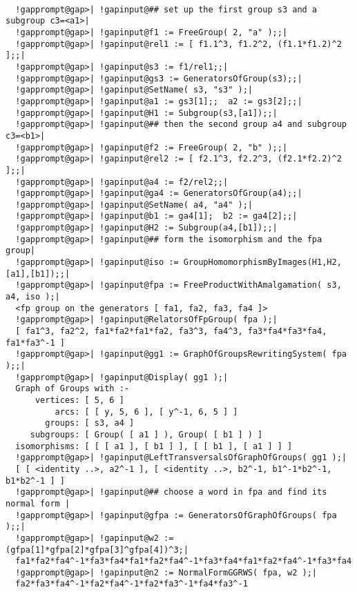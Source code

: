 \documentclass[a4paper,11pt]{report}
\begin{document}
{{{ }

 
\begin{Verbatim}[commandchars=!@|,fontsize=\small,frame=single,label=Example]
  
  !gapprompt@gap>| !gapinput@## set up the first group s3 and a subgroup c3=<a1>|
  !gapprompt@gap>| !gapinput@f1 := FreeGroup( 2, "a" );;|
  !gapprompt@gap>| !gapinput@rel1 := [ f1.1^3, f1.2^2, (f1.1*f1.2)^2 ];;|
  !gapprompt@gap>| !gapinput@s3 := f1/rel1;;|
  !gapprompt@gap>| !gapinput@gs3 := GeneratorsOfGroup(s3);;|
  !gapprompt@gap>| !gapinput@SetName( s3, "s3" );|
  !gapprompt@gap>| !gapinput@a1 := gs3[1];;  a2 := gs3[2];;|
  !gapprompt@gap>| !gapinput@H1 := Subgroup(s3,[a1]);;|
  !gapprompt@gap>| !gapinput@## then the second group a4 and subgroup c3=<b1>|
  !gapprompt@gap>| !gapinput@f2 := FreeGroup( 2, "b" );;|
  !gapprompt@gap>| !gapinput@rel2 := [ f2.1^3, f2.2^3, (f2.1*f2.2)^2 ];;|
  !gapprompt@gap>| !gapinput@a4 := f2/rel2;;|
  !gapprompt@gap>| !gapinput@ga4 := GeneratorsOfGroup(a4);;|
  !gapprompt@gap>| !gapinput@SetName( a4, "a4" );|
  !gapprompt@gap>| !gapinput@b1 := ga4[1];  b2 := ga4[2];;|
  !gapprompt@gap>| !gapinput@H2 := Subgroup(a4,[b1]);;|
  !gapprompt@gap>| !gapinput@## form the isomorphism and the fpa group|
  !gapprompt@gap>| !gapinput@iso := GroupHomomorphismByImages(H1,H2,[a1],[b1]);;|
  !gapprompt@gap>| !gapinput@fpa := FreeProductWithAmalgamation( s3, a4, iso );|
  <fp group on the generators [ fa1, fa2, fa3, fa4 ]>
  !gapprompt@gap>| !gapinput@RelatorsOfFpGroup( fpa );|
  [ fa1^3, fa2^2, fa1*fa2*fa1*fa2, fa3^3, fa4^3, fa3*fa4*fa3*fa4, fa1*fa3^-1 ]
  !gapprompt@gap>| !gapinput@gg1 := GraphOfGroupsRewritingSystem( fpa );;|
  !gapprompt@gap>| !gapinput@Display( gg1 );|
  Graph of Groups with :-
      vertices: [ 5, 6 ]
          arcs: [ [ y, 5, 6 ], [ y^-1, 6, 5 ] ]
        groups: [ s3, a4 ]
     subgroups: [ Group( [ a1 ] ), Group( [ b1 ] ) ]
  isomorphisms: [ [ [ a1 ], [ b1 ] ], [ [ b1 ], [ a1 ] ] ]
  !gapprompt@gap>| !gapinput@LeftTransversalsOfGraphOfGroups( gg1 );|
  [ [ <identity ..>, a2^-1 ], [ <identity ..>, b2^-1, b1^-1*b2^-1, b1*b2^-1 ] ]
  !gapprompt@gap>| !gapinput@## choose a word in fpa and find its normal form |
  !gapprompt@gap>| !gapinput@gfpa := GeneratorsOfGraphOfGroups( fpa );;|
  !gapprompt@gap>| !gapinput@w2 := (gfpa[1]*gfpa[2]*gfpa[3]^gfpa[4])^3;|
  fa1*fa2*fa4^-1*fa3*fa4*fa1*fa2*fa4^-1*fa3*fa4*fa1*fa2*fa4^-1*fa3*fa4
  !gapprompt@gap>| !gapinput@n2 := NormalFormGGRWS( fpa, w2 );|
  fa2*fa3*fa4^-1*fa2*fa4^-1*fa2*fa3^-1*fa4*fa3^-1
  
  
\end{Verbatim}
 

}}
\end{document}
